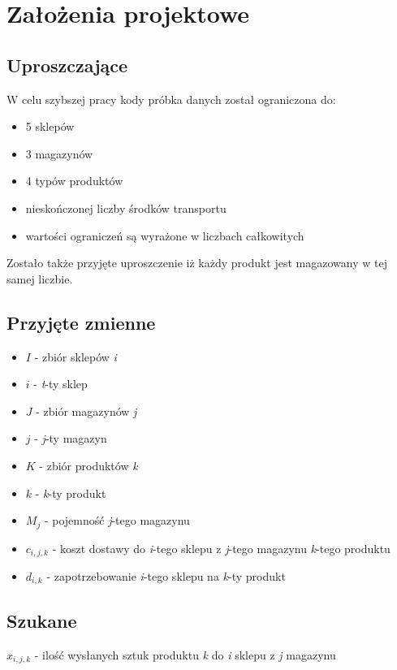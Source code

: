 \documentclass[11pt]{article}
\begin{document}
\section{Założenia projektowe}
\subsection{Uproszczające}
W celu szybszej pracy kody próbka danych został ograniczona do:
\begin{itemize}
	\item 5 sklepów 
	\item 3 magazynów
	\item 4 typów produktów
	\item nieskończonej liczby środków transportu 
	\item wartości ograniczeń są wyrażone w liczbach całkowitych 
\end{itemize}

Zostało także przyjęte uproszczenie iż każdy produkt jest magazowany w tej samej liczbie.

\subsection{Przyjęte zmienne}
\begin{itemize}
	\item $\displaystyle I$ - zbiór sklepów \textit{i}
	\item $\displaystyle i$ - \textit{t}-ty sklep 
    \item $\displaystyle J$ - zbiór magazynów \textit{j}
	\item $\displaystyle j$ - \textit{j}-ty magazyn 
	\item $\displaystyle K$ - zbiór produktów \textit{k}
	\item $\displaystyle k$ - \textit{k}-ty produkt
	\item $\displaystyle M_j$ - pojemność \textit{j}-tego magazynu 
	\item $\displaystyle c_{i,j,k}$ - koszt dostawy do \textit{i}-tego sklepu z \textit{j}-tego magazynu \textit{k}-tego produktu 
	\item $\displaystyle d_{i,k}$ - zapotrzebowanie \textit{i}-tego sklepu na \textit{k}-ty produkt
\end{itemize}

\subsection{Szukane}
$\displaystyle x_{i,j,k}$ - ilość wysłanych sztuk produktu \textit{k} do \textit{i} sklepu z \textit{j} magazynu
\end{document}
